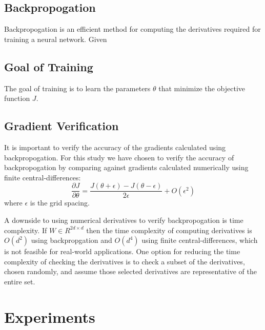 \documentclass{article}
\begin{document}
%
%
\subsection{Backpropogation}
Backpropogation is an efficient method for computing the derivatives required for training a neural network. Given


%
%
\subsection{Goal of Training}
The goal of training is to learn the parameters $\theta$ that minimize the objective function $J$.


%
%
\subsection{Gradient Verification}
It is important to verify the accuracy of the gradients calculated using backpropogation. For this study we have chosen to verify the accuracy of backpropogation by comparing against gradients calculated numerically using finite central-differences:
\begin{equation}
    \frac{\partial J}{\partial \theta} = \frac{J(\theta + \epsilon) - J(\theta - \epsilon)}{2\epsilon} + O(\epsilon ^2)
\end{equation}
where $\epsilon$ is the grid spacing.

A downside to using numerical derivatives to verify backpropogation is time complexity. If $W \in R^{2d \times d}$ then the time complexity of computing derivatives is $O(d^2)$ using backpropgation and $O(d^4)$ using finite central-differences, which is not feasible for real-world applications. One option for reducing the time complexity of checking the derivatives is to check a subset of the derivatives, chosen randomly, and assume those selected derivatives are representative of the entire set.


\section{Experiments}

%
%
\end{document}
